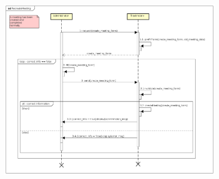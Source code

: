 \begin{figure}[!h]
	\centering\includegraphics[width=\textwidth]{Images/SequenceDiagrams/Admin/RecreateMeeting.png}{}
	\caption{}
\end{figure}

